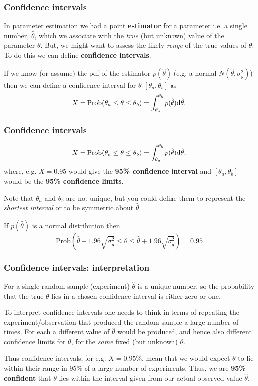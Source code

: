 \begin{frame}

\frametitle{Confidence intervals}
\label{confidenceintervals}

In parameter estimation we had a point \textbf{estimator} for a parameter i.e. a single number, $\hat{\theta}$,
which we associate with the \emph{true} (but unknown) value of the parameter $\theta$. But, we might want to assess
the likely \emph{range} of the true values of $\theta$. To do this we can define \textbf{confidence intervals}. 

If we know (or assume) the pdf of the estimator $p(\hat{\theta})$ (e.g. a normal
$N(\hat{\theta},\sigma^2_{\hat{\theta}})$) then we can define a confidence interval for $\theta$
$[\theta_a,\theta_b]$ as
\[
X = \text{Prob}(\theta_a \le \theta \le \theta_b) = \int_{\theta_a}^{\theta_b} p(\hat{\theta}) {\rm d}\hat{\theta}.
\]

\end{frame}

\begin{frame}

\frametitle{Confidence intervals}
\label{confidenceintervals}

\[
X = \text{Prob}(\theta_a \le \theta \le \theta_b) = \int_{\theta_a}^{\theta_b} p(\hat{\theta}) {\rm d}\hat{\theta},
\]
where, e.g. $X=0.95$ would give the \textbf{95\% confidence interval} and $[\theta_a, \theta_b]$ would be the
\textbf{95\% confidence limits}.

Note that $\theta_a$ and $\theta_b$ are not unique, but you could define them
to represent the \emph{shortest interval} or to be symmetric about $\hat{\theta}$.

If $p(\hat{\theta})$ is a normal distribution then
\[
\text{Prob}\left(\hat{\theta}-1.96\sqrt{\sigma^2_{\hat{\theta}}} \le \theta \le \hat{\theta}+1.96\sqrt{\sigma^2_{\hat{\theta}}}\right) = 0.95
\]

\end{frame}

\begin{frame}

\frametitle{Confidence intervals: interpretation}
\label{confidenceintervals:interpretation}

For a single random sample (experiment) $\hat{\theta}$ is a unique number, so the probability that the
true $\theta$ lies in a chosen confidence interval is either zero or one.

To interpret confidence intervals one needs to think in terms of repeating the experiment\slash observation
that produced the random sample a large number of times. For each a different value of $\hat{\theta}$
would be produced, and hence also different confidence limits for $\theta$, for the \emph{same} fixed (but
unknown) $\theta$.

Thus confidence intervals, for e.g. $X=0.95\%$, mean that we would expect $\theta$ to lie within their range
in 95\% of a large number of experiments. Thus, we are \textbf{95\% confident} that $\theta$ lies within the interval
given from our actual observed value $\hat{\theta}$.


\end{frame}

